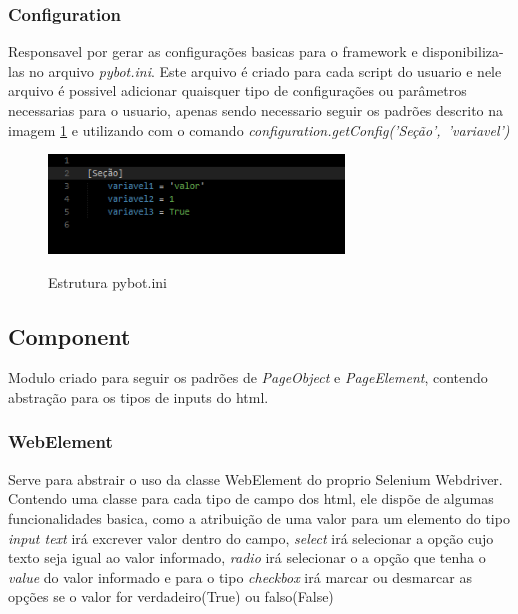         \subsubsection{Configuration}
        Responsavel por gerar as configurações basicas para o framework e disponibiliza-las no arquivo \emph{pybot.ini}.
        Este arquivo é criado para cada script do usuario e nele arquivo é possivel adicionar quaisquer tipo de configurações ou parâmetros
        necessarias para o usuario, apenas sendo necessario seguir os padrões descrito na imagem \ref{fig:pybot.ini} e utilizando com o comando
        \mbox{\emph{configuration.getConfig('Seção', 'variavel')}}

        \begin{figure}[H]
            \vspace*{0,3cm}
            \centering
            \caption{Estrutura pybot.ini}
            \includegraphics[width=0.7\textwidth]{./04-figuras/ini}
            \label{fig:pybot.ini}
        \end{figure}

    \subsection{Component}
        Modulo criado para seguir os padrões de \emph{PageObject} e \emph{PageElement}, contendo abstração para os tipos de inputs do html.

        \subsubsection{WebElement}
            Serve para abstrair o uso da classe WebElement do proprio Selenium Webdriver. Contendo uma classe para cada tipo de campo dos html,
            ele dispõe de algumas funcionalidades basica, como a atribuição de uma valor para um elemento do tipo \emph{input text} irá excrever
            valor dentro do campo, \emph{select} irá selecionar a opção cujo texto seja igual ao valor informado, \emph{radio} irá selecionar o
            a opção que tenha o \emph{value} do valor informado e para o tipo \emph{checkbox} irá marcar ou desmarcar as opções se o valor for
            verdadeiro(True) ou falso(False)

